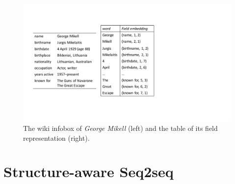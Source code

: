 \documentclass[letterpaper]{article} %
\begin{document}
\begin{figure}[]
\centering
\includegraphics[width=0.9\linewidth]{aaai_pic12.pdf}
\caption{The wiki infobox of \textit{George Mikell} (left) and the table of its field representation (right).}\label{table2}
\end{figure} 

\section{Structure-aware Seq2seq}
\end{document}
